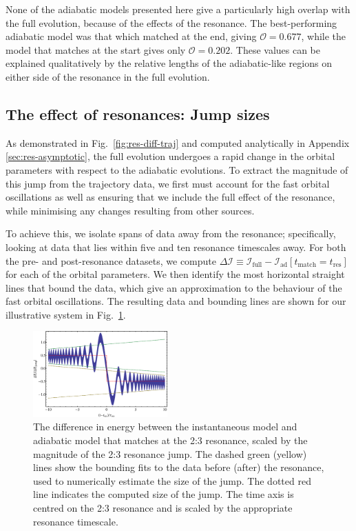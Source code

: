 \documentclass[aps,prd,amsfonts,amssymb,amsmath,nofootinbib,reprint,showpacs]{revtex4}
\newcommand{\figref}[1]{Fig.\ \ref{fig:#1}}
\newcommand{\apref}[1]{Appendix \ref{sec:#1}}
\begin{document}
None of the adiabatic models presented here give a particularly high overlap with the full evolution, because of the effects of the resonance. The best-performing adiabatic model was that which matched at the end, giving $\mathcal{O} = 0.677$, while the model that matches at the start gives only $\mathcal{O} = 0.202$. These values can be explained qualitatively by the relative lengths of the adiabatic-like regions on either side of the resonance in the full evolution. 

\subsection{The effect of resonances: Jump sizes}

As demonstrated in \figref{res-diff-traj} and computed analytically in \apref{res-asymptotic}, the full evolution undergoes a rapid change in the orbital parameters with respect to the adiabatic evolutions. To extract the magnitude of this jump from the trajectory data, we first must account for the fast orbital oscillations as well as ensuring that we include the full effect of the resonance, while minimising any changes resulting from other sources.

To achieve this, we isolate spans of data away from the resonance; specifically, looking at data that lies within five and ten resonance timescales away. For both the pre- and post-resonance datasets, we compute $\Delta \mathcal{I} \equiv \mathcal{I}_{\mathrm{full}} - \mathcal{I}_\mathrm{ad}[t_{\mathrm{match}} = t_\mathrm{res}]$ for each of the orbital parameters. We then identify the most horizontal straight lines that bound the data, which give an approximation to the behaviour of the fast orbital oscillations. The resulting data and bounding lines are shown for our illustrative system in \figref{res-jump-calc}.

\begin{figure}[htbp]
\centering
\includegraphics[width=0.46\textwidth]{Fig_res_jump_calc}
\caption{\label{fig:res-jump-calc}The difference in energy between the instantaneous model and adiabatic model that matches at the 2:3 resonance, scaled by the magnitude of the 2:3 resonance jump. The dashed green (yellow) lines show the bounding fits to the data before (after) the resonance, used to numerically estimate the size of the jump. The dotted red line indicates the computed size of the jump. The time axis is centred on the 2:3 resonance and is scaled by the appropriate resonance timescale.}
\end{figure}
\end{document}
